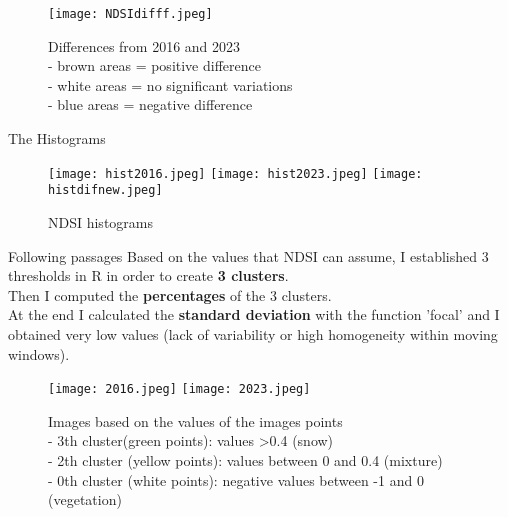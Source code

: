 \documentclass{beamer}
\begin{document}
\begin{frame}
    
\begin{figure}
    \centering
    \texttt{[image: NDSIdifff.jpeg]}
    \caption{Differences from 2016 and 2023\\
    \tiny - brown areas = positive difference \\ 
    \tiny - white areas = no significant variations\\
    \tiny - blue areas = negative difference }

\end{figure}

\end{frame}


\begin{frame}{The Histograms}
\begin{figure}
  
    \texttt{[image: hist2016.jpeg]} \hfill
    \texttt{[image: hist2023.jpeg]} \hfill
    \texttt{[image: histdifnew.jpeg]}  \hfill  
    \caption{NDSI histograms}

\end{figure}


\end{frame}



\begin{frame}{Following passages}
Based on the values that NDSI can assume, I established 3 thresholds in R in order to create \textbf{3 clusters}. \\
Then I computed the \textbf{percentages} of the 3 clusters.\\
\vspace{0.2cm}
At the end I calculated the \textbf{standard deviation} with the function 'focal' and I obtained very low values (lack of variability or high homogeneity within moving windows).  
    

\end{frame}

\begin{frame}
    
\begin{figure}
    \centering
    \texttt{[image: 2016.jpeg]}
    \texttt{[image: 2023.jpeg]}
    \caption{Images based on the values of the images points\\
    \tiny - 3th cluster(green points): values \textgreater  0.4 (snow)\\
    \tiny - 2th cluster (yellow points): values between 0 and 0.4 (mixture) \\
    \tiny - 0th cluster (white points): negative values between -1 and 0 (vegetation)  }
  
\end{figure}

\end{frame}
\end{document}
